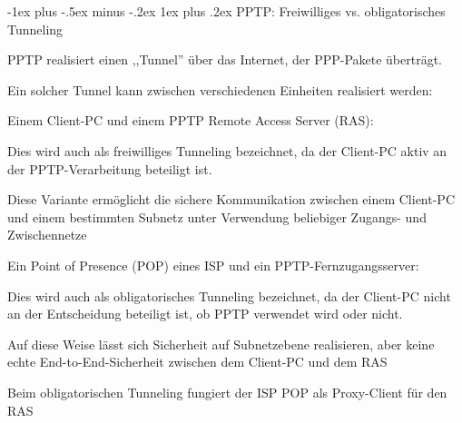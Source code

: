 \documentclass[a4paper]{article}
\makeatletter
\renewcommand{\subsubsection}{\@startsection{subsubsection}{3}{0mm}%
 {-1ex plus -.5ex minus -.2ex}%
 {1ex plus .2ex}%
 {\normalfont\small\bfseries}}
\makeatother
\begin{document}
\begin{multicols}{3}


      \subsubsection{PPTP: Freiwilliges vs. obligatorisches
            Tunneling}

      \begin{itemize*}
            \item PPTP realisiert einen ,,Tunnel'' über das Internet, der PPP-Pakete
            überträgt.
            \item Ein solcher Tunnel kann zwischen verschiedenen Einheiten realisiert
            werden:
            \begin{itemize*}
                  \item Einem Client-PC und einem PPTP Remote Access Server (RAS):
                  \begin{itemize*} \item Dies wird auch als freiwilliges Tunneling bezeichnet, da der Client-PC aktiv an der PPTP-Verarbeitung beteiligt ist. \item Diese Variante ermöglicht die sichere Kommunikation zwischen einem Client-PC und einem bestimmten Subnetz unter Verwendung beliebiger Zugangs- und Zwischennetze \end{itemize*}
                  \item Ein Point of Presence (POP) eines ISP und ein PPTP-Fernzugangsserver:
                  \begin{itemize*} \item Dies wird auch als obligatorisches Tunneling bezeichnet, da der Client-PC nicht an der Entscheidung beteiligt ist, ob PPTP verwendet wird oder nicht. \item Auf diese Weise lässt sich Sicherheit auf Subnetzebene realisieren, aber keine echte End-to-End-Sicherheit zwischen dem Client-PC und dem RAS \item Beim obligatorischen Tunneling fungiert der ISP POP als Proxy-Client für den RAS \end{itemize*}
            \end{itemize*}
      \end{itemize*}


\end{multicols}
\end{document}
